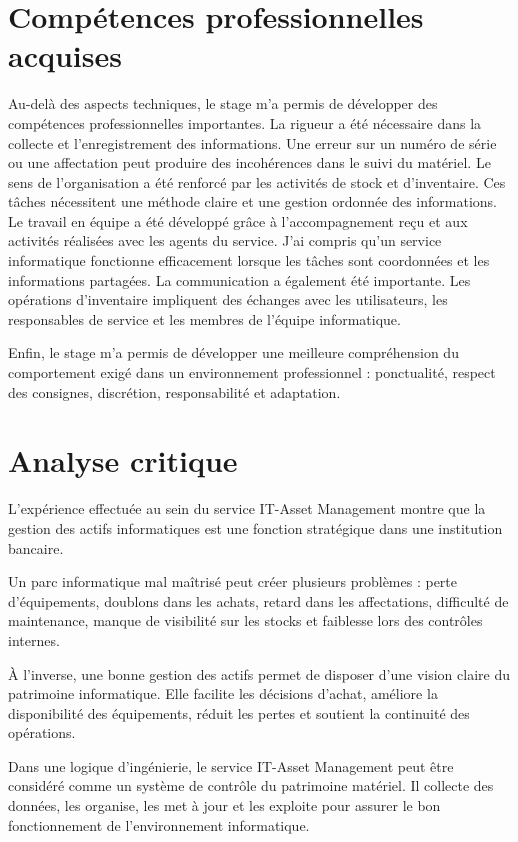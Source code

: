 \documentclass[12pt,a4paper]{report}
\begin{document}
\section{Compétences professionnelles acquises}

Au-delà des aspects techniques, le stage m'a permis de développer des compétences professionnelles importantes.
La rigueur a été nécessaire dans la collecte et l'enregistrement des informations. Une erreur sur un numéro de série ou une affectation peut produire des incohérences dans le suivi du matériel.
Le sens de l'organisation a été renforcé par les activités de stock et d'inventaire. Ces tâches nécessitent une méthode claire et une gestion ordonnée des informations.
Le travail en équipe a été développé grâce à l'accompagnement reçu et aux activités réalisées avec les agents du service. J'ai compris qu'un service informatique fonctionne efficacement lorsque les tâches sont coordonnées et les informations partagées.
La communication a également été importante. Les opérations d'inventaire impliquent des échanges avec les utilisateurs, les responsables de service et les membres de l'équipe informatique.

Enfin, le stage m'a permis de développer une meilleure compréhension du comportement exigé dans un environnement professionnel : ponctualité, respect des consignes, discrétion, responsabilité et adaptation.

\section{Analyse critique}

L'expérience effectuée au sein du service IT-Asset Management montre que la gestion des actifs informatiques est une fonction stratégique dans une institution bancaire.

Un parc informatique mal maîtrisé peut créer plusieurs problèmes : perte d'équipements, doublons dans les achats, retard dans les affectations, difficulté de maintenance, manque de visibilité sur les stocks et faiblesse lors des contrôles internes.

À l'inverse, une bonne gestion des actifs permet de disposer d'une vision claire du patrimoine informatique. Elle facilite les décisions d'achat, améliore la disponibilité des équipements, réduit les pertes et soutient la continuité des opérations.

Dans une logique d'ingénierie, le service IT-Asset Management peut être considéré comme un système de contrôle du patrimoine matériel. Il collecte des données, les organise, les met à jour et les exploite pour assurer le bon fonctionnement de l'environnement informatique.
\end{document}
